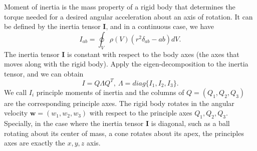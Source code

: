 Moment of inertia is the mass property of a rigid body that determines 
the torque needed for a desired angular acceleration about an axis of 
rotation. 
It can be defined by the inertia tensor $\mathbf{I}$, and in a continuous 
case, we have
\begin{equation}
I_{ab} = \oint_V \rho(V) (r^2\delta_{ab}-ab) dV.
\end{equation}
The inertia tensor $\mathbf{I}$ is constant with respect to the body axes 
(the axes that moves along with the rigid body). 
Apply the eigen-decomposition to the inertia tensor, and we can obtain
\begin{equation}
I = Q \Lambda Q^T,\ \Lambda = diag\{I_1, I_2, I_3\}.
\end{equation}
We call $I_i$ principle moments of inertia and the columns of 
$Q = (Q_1,Q_2,Q_3)$ are the corresponding principle axes. 
The rigid body rotates in the angular velocity 
$\mathbf{w} = (w_1, w_2, w_3)$ with respect to the principle axes 
$Q_1, Q_2, Q_3$. 
Specially, in the case where the inertia tensor $\mathbf{I}$ is diagonal, 
such as a ball rotating about its center of mass, a cone rotates about 
its apex, the principles axes are exactly the $x,y,z$ axis.

